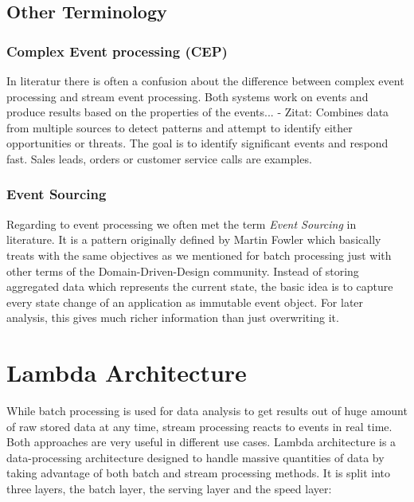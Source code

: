 \subsection{Other Terminology}
\subsubsection{Complex Event processing (CEP)}
In literatur there is often a confusion about the difference between
complex event processing and stream event processing. Both systems work on
events and produce results based on the properties of the events... 
- Zitat: Combines data from multiple sources  to detect patterns and attempt to
identify either opportunities or threats. The goal is to identify significant
events and respond fast. Sales leads, orders or customer service calls are
examples.\\


\subsubsection{Event Sourcing}
\label{event-sourcing}
Regarding to event processing we often met the term \textit{Event Sourcing} in
literature. It is a pattern originally defined by Martin Fowler which basically
treats with the same objectives as we mentioned for batch processing just with
other terms of the Domain-Driven-Design community. Instead of storing aggregated
data which represents the current state, the basic idea is to capture
every state change of an application as immutable event object. For later
analysis, this gives much richer information than just overwriting it. 

\section{Lambda Architecture}
While batch processing is used for data analysis to get results out of huge
amount of raw stored data at any time, stream processing reacts to events in
real time. Both approaches are very useful in different use cases. Lambda
architecture is a data-processing architecture designed to handle massive
quantities of data by taking advantage of both batch and stream processing
methods. It is split into three layers, the batch layer, the serving layer and
the speed layer:

